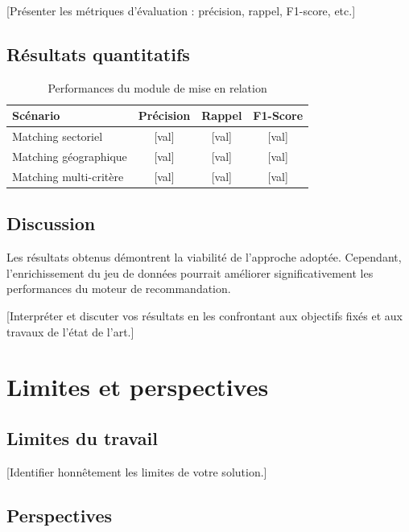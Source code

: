 \documentclass[12pt, a4paper, oneside]{report}
\begin{document}
[Présenter les métriques d'évaluation : précision, rappel, F1-score, etc.]

\subsection{Résultats quantitatifs}

\begin{table}[H]
  \centering
  \caption{Performances du module de mise en relation}
  \label{tab:performances}
  \renewcommand{\arraystretch}{1.4}
  \begin{tabular}{lccc}
    \toprule
    \rowcolor{primary!20}
    \textbf{Scénario} & \textbf{Précision} & \textbf{Rappel} & \textbf{F1-Score} \\
    \midrule
    Matching sectoriel   & [val] & [val] & [val] \\
    \rowcolor{lightgray}
    Matching géographique & [val] & [val] & [val] \\
    Matching multi-critère & [val] & [val] & [val] \\
    \bottomrule
  \end{tabular}
\end{table}

\subsection{Discussion}

\begin{remarque}
  Les résultats obtenus démontrent la viabilité de l'approche adoptée. Cependant, l'enrichissement du jeu de données pourrait améliorer significativement les performances du moteur de recommandation.
\end{remarque}

[Interpréter et discuter vos résultats en les confrontant aux objectifs fixés et aux travaux de l'état de l'art.]

\section{Limites et perspectives}
\label{sec:limites}

\subsection{Limites du travail}

[Identifier honnêtement les limites de votre solution.]

\subsection{Perspectives}
\end{document}
